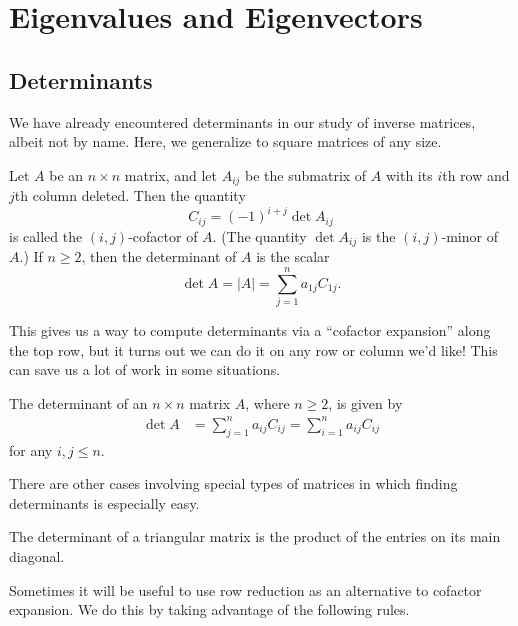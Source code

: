 \documentclass[../m073main.tex]{subfiles}
\begin{document}
\chapter{Eigenvalues and Eigenvectors}
\section{Determinants}
We have already encountered determinants in our study of inverse matrices, albeit not by name.
Here, we generalize to square matrices of any size.

\begin{definition}[Determinant]
	Let $A$ be an $n \times n$ matrix, and let $A_{ij}$ be the submatrix of $A$ with its $i$th row and $j$th column deleted.
	Then the quantity
	\[ C_{ij} = (-1)^{i+j} \det A_{ij} \]
	is called the $(i,j)$-cofactor of $A$.
	(The quantity $\det A_{ij}$ is the $(i,j)$-minor of $A$.)
	If $n \geq 2$, then the determinant of $A$ is the scalar
	\[ \det A = |A| = \sum_{j = 1}^{n} a_{1j} C_{1j}. \]
\end{definition}

This gives us a way to compute determinants via a ``cofactor expansion'' along the top row, but it turns out we can do it on any row or column we'd like!
This can save us a lot of work in some situations.

\begin{theorem}
	The determinant of an $n \times n$ matrix $A$, where $n \geq 2$, is given by
	\begin{align*}
		\det A &= \sum_{j = 1}^{n} a_{ij} C_{ij} = \sum_{i = 1}^{n} a_{ij} C_{ij}
	\end{align*}
	for any $i,j \leq n$.
\end{theorem}

There are other cases involving special types of matrices in which finding determinants is especially easy.

\begin{theorem}
	The determinant of a triangular matrix is the product of the entries on its main diagonal.
\end{theorem}

Sometimes it will be useful to use row reduction as an alternative to cofactor expansion.
We do this by taking advantage of the following rules.
\end{document}
